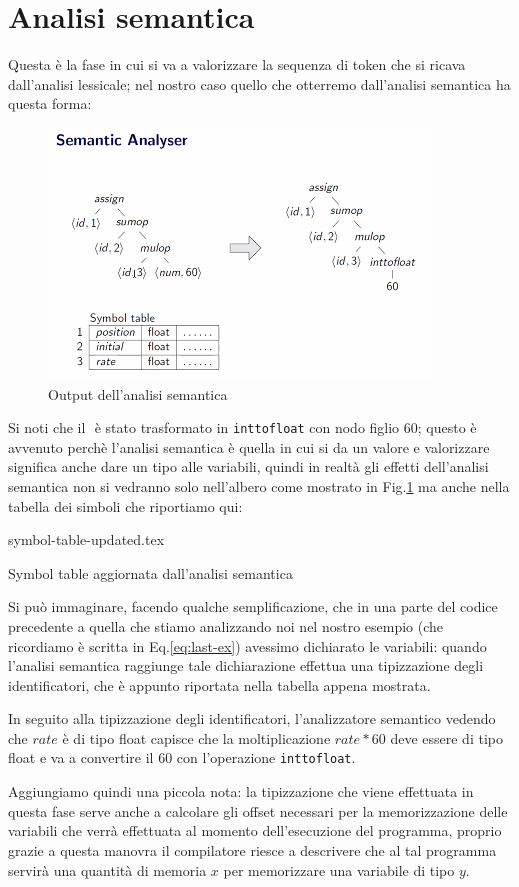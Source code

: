 \documentclass[class=book, crop=false, oneside, 12pt]{standalone}
\begin{document}
\section{Analisi semantica}
Questa è la fase in cui si va a valorizzare la sequenza di token che si ricava dall'analisi lessicale; nel nostro caso quello che otterremo dall'analisi semantica ha questa forma:
\begin{figure}[H]
    \centering
    \includegraphics[width=.4\textwidth]{final-example-semantic-output.png}
    \caption{Output dell'analisi semantica}
    \label{fig:last-ex-semantic-output}
\end{figure}
Si noti che il \(<num, 60>\) è stato trasformato in \texttt{inttofloat} con nodo figlio \(60\); questo è avvenuto perchè l'analisi semantica è quella in cui si da un valore e valorizzare significa anche dare un tipo alle variabili, quindi in realtà gli effetti dell'analisi semantica non si vedranno solo nell'albero come mostrato in Fig.\ref{fig:last-ex-semantic-output} ma anche nella tabella dei simboli che riportiamo qui:
\begin{table}[H]
	\centering
	{symbol-table-updated.tex}
    \caption{Symbol table aggiornata dall'analisi semantica}
    \label{tab:last-ex-symbol-table-updated}
\end{table}
Si può immaginare, facendo qualche semplificazione, che in una parte del codice precedente a quella che stiamo analizzando noi nel nostro esempio (che ricordiamo è scritta in Eq.\ref{eq:last-ex}) avessimo dichiarato le variabili: quando l'analisi semantica raggiunge tale dichiarazione effettua una tipizzazione degli identificatori, che è appunto riportata nella tabella appena mostrata.

In seguito alla tipizzazione degli identificatori, l'analizzatore semantico vedendo che \(rate\) è di tipo float capisce che la moltiplicazione \(rate * 60\) deve essere di tipo float e va a convertire il \(60\) con l'operazione \texttt{inttofloat}.

Aggiungiamo quindi una piccola nota: la tipizzazione che viene effettuata in questa fase serve anche a calcolare gli offset necessari per la memorizzazione delle variabili che verrà effettuata al momento dell'esecuzione del programma, proprio grazie a questa manovra il compilatore riesce a descrivere che al tal programma servirà una quantità di memoria \(x\) per memorizzare una variabile di tipo \(y\).
\end{document}
